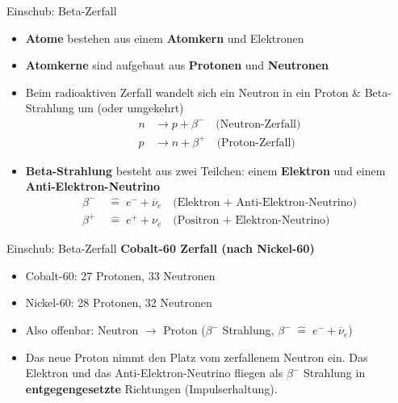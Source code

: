\begin{frame}{Einschub: Beta-Zerfall}
    \begin{itemize}
        \item \textbf{Atome} bestehen aus einem \textbf{Atomkern} und Elektronen
        \item \textbf{Atomkerne} sind aufgebaut aus \textbf{Protonen} und \textbf{Neutronen}
        \item Beim radioaktiven Zerfall wandelt sich ein Neutron in ein Proton \& Beta-Strahlung um (oder umgekehrt) 
        \begin{align*}
                n &\to p + \beta^- \quad \text{(Neutron-Zerfall)}\\
                p &\to n + \beta^+ \quad \text{(Proton-Zerfall)}
        \end{align*}
        \item \textbf{Beta-Strahlung} besteht aus zwei Teilchen: einem \textbf{Elektron} und einem \textbf{Anti-Elektron-Neutrino}
        \begin{align*}
            \beta^- &\;\hat{=}\; e^- + \overline{\nu}_e \quad \text{(Elektron + Anti-Elektron-Neutrino)}\\
            \beta^+ &\;\hat{=}\; e^+ + \nu_e \quad \text{(Positron + Elektron-Neutrino)}
        \end{align*}
    \end{itemize}
\end{frame}

\begin{frame}{Einschub: Beta-Zerfall}
    \textbf{Cobalt-60 Zerfall (nach Nickel-60)}
    \begin{itemize}
        \item Cobalt-60: 27 Protonen, 33 Neutronen
        \item Nickel-60: 28 Protonen, 32 Neutronen
        \item Also offenbar: Neutron $\to$ Proton ($\beta^-$ Strahlung, $\beta^- \;\hat{=}\; e^- + \overline{\nu}_e$)
        \item Das neue Proton nimmt den Platz vom zerfallenem Neutron ein. Das Elektron und das Anti-Elektron-Neutrino fliegen als $\beta^-$ Strahlung in \textbf{entgegengesetzte} Richtungen (Impulserhaltung).
    \end{itemize}
\end{frame}

